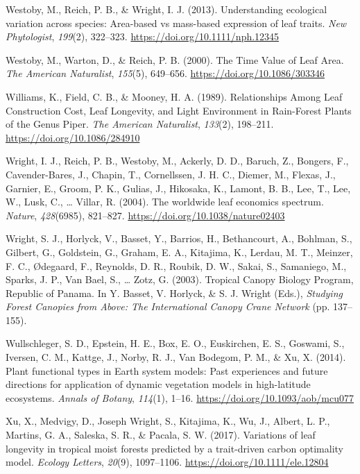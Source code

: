\documentclass[
  12pt,
  a4paper,
,tablecaptionabove
]{scrartcl}
\newlength{\cslhangindent}
\newenvironment{CSLReferences}[2] %
 {%
  \setlength{\parindent}{0pt}
  \ifodd #1 \everypar{\setlength{\hangindent}{\cslhangindent}}\ignorespaces\fi
  \ifnum #2 > 0
  \setlength{\parskip}{#2\baselineskip}
  \fi
 }%
 {}
\begin{document}
\begin{CSLReferences}{1}{0}
\leavevmode{}%
Westoby, M., Reich, P. B., \& Wright, I. J. (2013). Understanding
ecological variation across species: {Area-based} vs mass-based
expression of leaf traits. \emph{New Phytologist}, \emph{199}(2),
322--323. \url{https://doi.org/10.1111/nph.12345}

\leavevmode{}%
Westoby, M., Warton, D., \& Reich, P. B. (2000). The {Time Value} of
{Leaf Area}. \emph{The American Naturalist}, \emph{155}(5), 649--656.
\url{https://doi.org/10.1086/303346}

\leavevmode{}%
Williams, K., Field, C. B., \& Mooney, H. A. (1989). Relationships
{Among Leaf Construction Cost}, {Leaf Longevity}, and {Light
Environment} in {Rain-Forest Plants} of the {Genus Piper}. \emph{The
American Naturalist}, \emph{133}(2), 198--211.
\url{https://doi.org/10.1086/284910}

\leavevmode{}%
Wright, I. J., Reich, P. B., Westoby, M., Ackerly, D. D., Baruch, Z.,
Bongers, F., Cavender-Bares, J., Chapin, T., Cornellssen, J. H. C.,
Diemer, M., Flexas, J., Garnier, E., Groom, P. K., Gulias, J., Hikosaka,
K., Lamont, B. B., Lee, T., Lee, W., Lusk, C., \ldots{} Villar, R.
(2004). The worldwide leaf economics spectrum. \emph{Nature},
\emph{428}(6985), 821--827. \url{https://doi.org/10.1038/nature02403}

\leavevmode{}%
Wright, S. J., Horlyck, V., Basset, Y., Barrios, H., Bethancourt, A.,
Bohlman, S., Gilbert, G., Goldstein, G., Graham, E. A., Kitajima, K.,
Lerdau, M. T., Meinzer, F. C., Ødegaard, F., Reynolds, D. R., Roubik, D.
W., Sakai, S., Samaniego, M., Sparks, J. P., Van Bael, S., \ldots{}
Zotz, G. (2003). Tropical {Canopy Biology Program}, {Republic} of
{Panama}. In Y. Basset, V. Horlyck, \& S. J. Wright (Eds.),
\emph{Studying {Forest Canopies} from {Above}: {The International Canopy
Crane Network}} (pp. 137--155).

\leavevmode{}%
Wullschleger, S. D., Epstein, H. E., Box, E. O., Euskirchen, E. S.,
Goswami, S., Iversen, C. M., Kattge, J., Norby, R. J., Van Bodegom, P.
M., \& Xu, X. (2014). Plant functional types in {Earth} system models:
{Past} experiences and future directions for application of dynamic
vegetation models in high-latitude ecosystems. \emph{Annals of Botany},
\emph{114}(1), 1--16. \url{https://doi.org/10.1093/aob/mcu077}

\leavevmode{}%
Xu, X., Medvigy, D., Joseph Wright, S., Kitajima, K., Wu, J., Albert, L.
P., Martins, G. A., Saleska, S. R., \& Pacala, S. W. (2017). Variations
of leaf longevity in tropical moist forests predicted by a trait-driven
carbon optimality model. \emph{Ecology Letters}, \emph{20}(9),
1097--1106. \url{https://doi.org/10.1111/ele.12804}

\end{CSLReferences}
\end{document}
